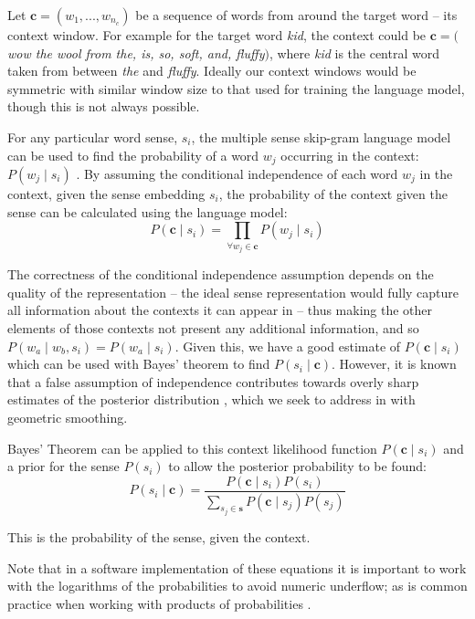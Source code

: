 \documentclass{article} %
\def\parencite{\cite} %
\renewcommand{\c}{\mathbf{c}}
\newcommand{\s}{\mathbf{s}}
\begin{document}
Let $\c=(w_{1},...,w_{n_c})$ be a sequence of words from around the target word -- its context window.
For example for the target word \emph{kid}, the context could be $\c=($ \emph{ wow the wool from the, is, so, soft, and, fluffy}$)$, where \emph{kid} is the central word taken from between \emph{the} and \emph{fluffy}.
Ideally our context windows would be symmetric with similar window size to that used for training the language model, though this is not always possible.

For any particular word sense, $s_i$, the multiple sense skip-gram language model can be used to
find the probability of a word $w_j$ occurring in the context: $P(w_j \mid s_i)$
\parencite{tian2014probabilistic,AdaGrams}.
By assuming the conditional independence of each word $w_j$ in the context, given the sense embedding $s_i$, the probability of the context given the sense can be calculated using the language model:
\begin{equation} \label{eq:contextprobtrue}
P(\c \mid s_{i})=\prod_{\forall w_{j}\in\c}P(w_{j} \mid s_{i})
\end{equation}

The correctness of the conditional independence assumption depends on the quality of the representation -- the ideal sense representation would fully capture all information about the contexts it can appear in -- thus making the other elements of those contexts not present any additional information, and so  $P(w_a \mid w_b,s_i)=P(w_a \mid s_i)$. Given this, we have a good estimate of $P(\c \mid s_{i})$ which can be used with Bayes' theorem to find $P( s_i \mid \c)$. However, it is known that a false assumption of independence contributes towards overly sharp estimates of the posterior distribution \cite{rosenfeld2000two}, which we seek to address in  with geometric smoothing.


Bayes' Theorem can be applied to this context likelihood function  $P(\c \mid s_{i})$ and a prior for the sense $P(s_i)$ to allow the posterior probability to be found:
\begin{equation} \label{eq:generalwsd}
P(s_{i} \mid \c) =
\dfrac{P(\c \mid s_{i})P(s_{i})}
{\sum_{s_{j}\in\s} P(\c \mid s_{j})P(s_{j})}
\end{equation}

This is the probability of the sense, given the context.

Note that in a software implementation of these equations it is important to work with the logarithms of the probabilities to avoid numeric underflow; as is common practice when working with products of probabilities \parencite{press2007numerical}.
\end{document}
